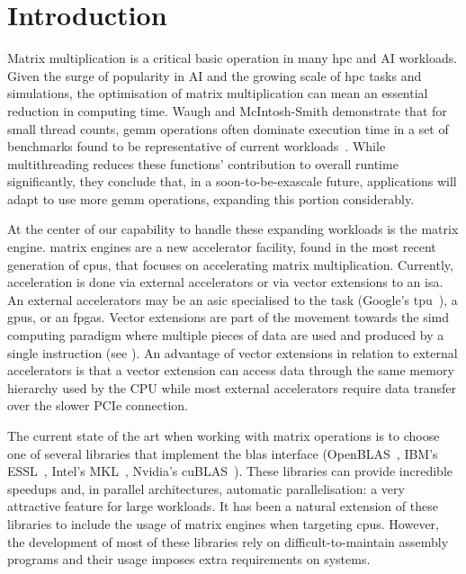 \documentclass[\main/thesis.tex]{subfiles}
\begin{document}
\chapter{Introduction}
\label{cha:intro}

Matrix multiplication is a critical basic operation in many \gls{hpc} and AI workloads.
Given the surge of popularity in AI and the growing scale of \gls{hpc} tasks and simulations, the optimisation of matrix multiplication can mean an essential reduction in computing time.
Waugh and McIntosh-Smith demonstrate that for small thread counts, \gls{gemm} operations often dominate execution time in a set of benchmarks found to be representative of current workloads~\autocite{waugh2020use}.
While multithreading reduces these functions' contribution to overall runtime significantly, they conclude that, in a soon-to-be-exascale future, applications will adapt to use more \gls{gemm} operations, expanding this portion considerably.

At the center of our capability to handle these expanding workloads is the \gls{matrix engine}.
\Glspl{matrix engine} are a new accelerator facility, found in the most recent generation of \glspl{cpu}, that focuses on accelerating matrix multiplication.
Currently, acceleration is done via external accelerators or via vector extensions to an \gls{isa}.
An external accelerators may be an \gls{asic} specialised to the task (\eg Google's \gls{tpu}~\autocite{abadi2016tensorflow}), a \glspl{gpu}, or an \glspl{fpga}.
Vector extensions are part of the movement towards the \gls{simd} computing paradigm where multiple pieces of data are used and produced by a single instruction (see ).
An advantage of vector extensions in relation to external accelerators is that a vector extension can access data through the same memory hierarchy used by the CPU while most external accelerators require data transfer over the slower PCIe connection.

The current state of the art when working with matrix operations is to choose one of several libraries that implement the \gls{blas} interface (\eg OpenBLAS~\autocite{xianyi2012model}, IBM's ESSL~\autocite{ibm2021engineering}, Intel's MKL~\autocite{wang2014intel,intel2021accelerate}, Nvidia's cuBLAS~\autocite{nvidia2021cublas}).
These libraries can provide incredible speedups and, in parallel architectures, automatic parallelisation: a very attractive feature for large workloads.
It has been a natural extension of these libraries to include the usage of matrix engines when targeting \glspl{cpu}.
However, the development of most of these libraries rely on difficult-to-maintain assembly programs and their usage imposes  extra requirements on systems.
\end{document}
